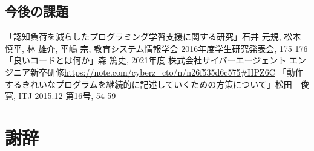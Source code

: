 \documentclass[12pt, a4paper]{jreport}
\begin{document}
\section{今後の課題}
\renewcommand{\bibname}{参考文献}
\begin{thebibliography}{10}
「認知負荷を減らしたプログラミング学習支援に関する研究」石井 元規, 松本 慎平, 林 雄介, 平嶋 宗, 教育システム情報学会 2016年度学生研究発表会, 175-176
「良いコードとは何か」森 篤史, 2021年度 株式会社サイバーエージェント エンジニア新卒研修\url{https://note.com/cyberz_cto/n/n26f535d6c575#HPZ6C}
「動作するきれいなプログラムを継続的に記述していくための方策について」松田　俊寛, ITJ 2015.12 第16号, 54-59
\end{thebibliography}

\chapter*{謝辞}
\end{document}
